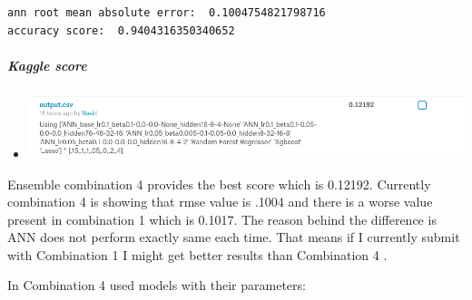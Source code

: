\documentclass[11pt, a4paper , landscape]{article}
\makeatletter
\def\maxwidth{\ifdim\Gin@nat@width>\linewidth\linewidth
    \else\Gin@nat@width\fi}
\let\Oldincludegraphics\includegraphics
\renewcommand{\includegraphics}[1]{\Oldincludegraphics[width=.8\maxwidth]{#1}}
\providecommand{\tightlist}{%
      \setlength{\itemsep}{0pt}\setlength{\parskip}{0pt}}
\makeatother
\begin{document}
    \begin{Verbatim}[commandchars=\\\{\}]
ann root mean absolute error:  0.1004754821798716
accuracy score:  0.9404316350340652

    \end{Verbatim}

    \subparagraph{Kaggle score}\label{kaggle-score}

\begin{itemize}
\tightlist
\item
  \includegraphics{img/kaggle_score.png}
\end{itemize}

    Ensemble combination 4 provides the best score which is 0.12192.
Currently combination 4 is showing that rmse value is .1004 and there is
a worse value present in combination 1 which is 0.1017. The reason
behind the difference is ANN does not perform exactly same each time.
That means if I currently submit with Combination 1 I might get better
results than Combination 4 .

In Combination 4 used models with their parameters:
\end{document}

